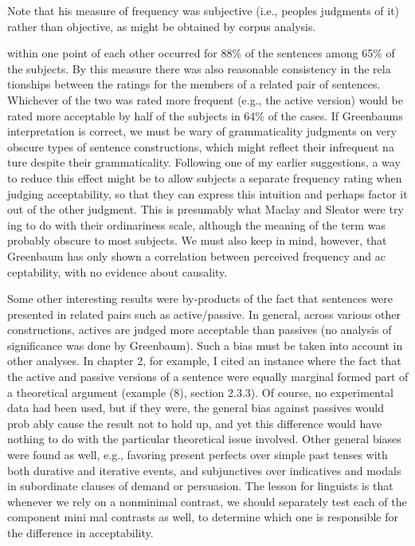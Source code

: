 \setcounter{listWWNumxxxiileveli}{5}
\begin{listWWNumxxxiileveli}
\item 
\begin{styleStandard}
Note that his measure of frequency was subjective (i.e., people{\textquotesingle}s judgments of it) rather than objective, as might be obtained by corpus analysis.
\end{styleStandard}


\end{listWWNumxxxiileveli}
\clearpage\setcounter{page}{1}\begin{styleTextbody}
within one point of each other occurred for 88\% of the sentences among 65\% of the subjects. By this measure there was also reasonable consistency in the rela\- tionships between the ratings for the members of a related pair of sentences. Whichever of the two was rated more frequent (e.g., the active version) would be rated more acceptable by half of the subjects in 64\% of the cases. If Greenbaum{\textquotesingle}s interpretation is correct, we must be wary of grammaticality judgments on very obscure types of sentence constructions, which might reflect their infrequent na\- ture despite their grammaticality. Following one of my earlier suggestions, a way to reduce this effect might be to allow subjects a separate frequency rating when judging acceptability, so that they can express this intuition and perhaps factor it out of the other judgment. This is presumably what Maclay and Sleator were try\- ing to do with their ordinariness scale, although the meaning of the term was probably obscure to most subjects. We must also keep in mind, however, that Greenbaum has only shown a correlation between perceived frequency and ac\- ceptability, with no evidence about causality.
\end{styleTextbody}


\begin{styleTextbody}
Some other interesting results were by-products of the fact that sentences were presented in related pairs such as active/passive. In general, across various other constructions, actives are judged more acceptable than passives (no analysis of significance was done by Greenbaum). Such a bias must be taken into account in other analyses. In chapter 2, for example, I cited an instance where the fact that the active and passive versions of a sentence were equally marginal formed part of a theoretical argument (example (8), section 2.3.3). Of course, no experimental data had been used, but if they were, the general bias against passives would prob\- ably cause the result not to hold up, and yet this difference would have nothing to do with the particular theoretical issue involved. Other general biases were found as well, e.g., favoring present perfects over simple past tenses with both durative and iterative events, and subjunctives over indicatives and modals in subordinate clauses of demand or persuasion. The lesson for linguists is that whenever we rely on a nonminimal contrast, we should separately test each of the component mini\- mal contrasts as well, to determine which one is responsible for the difference in acceptability.
\end{styleTextbody}


